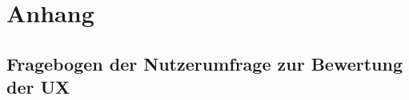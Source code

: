 \documentclass[a4paper, 12pt, oneside]{scrbook}
\begin{document}
\frontmatter





\tableofcontents

\cleardoublepage
{}
{}
\listoffigures





\mainmatter






\backmatter
\sloppy
\printbibliography
{}

\appendix
\chapter*{Anhang}

\section*{Fragebogen der Nutzerumfrage zur Bewertung der UX}
\label{app:fragebogenNutzerumfrage}

\end{document}
